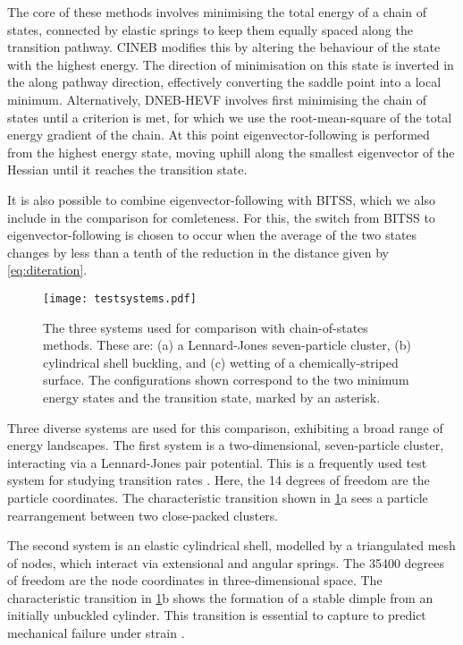 \documentclass[aip,jcp,reprint,twocolumn]{revtex4-1}
\begin{document}
The core of these methods involves minimising the total energy of a chain of states, connected by elastic springs to keep them equally spaced along the transition pathway.
CINEB modifies this by altering the behaviour of the state with the highest energy.
The direction of minimisation on this state is inverted in the along pathway direction, effectively converting the saddle point into a local minimum.
Alternatively, DNEB-HEVF involves first minimising the chain of states until a criterion is met, for which we use the root-mean-square of the total energy gradient of the chain. 
At this point eigenvector-following is performed from the highest energy state, moving uphill along the smallest eigenvector of the Hessian until it reaches the transition state.

It is also possible to combine eigenvector-following with BITSS, which we also include in the comparison for comleteness.
For this, the switch from BITSS to eigenvector-following is chosen to occur when the average of the two states changes by less than a tenth of the reduction in the distance given by \cref{eq:diteration}.

\begin{figure}[tb]
  \texttt{[image: testsystems.pdf]}
  \caption{\label{fig:testsystems}
    The three systems used for comparison with chain-of-states methods.
    These are: (a) a Lennard-Jones seven-particle cluster, (b) cylindrical shell buckling, and (c) wetting of a chemically-striped surface.
    The configurations shown correspond to the two minimum energy states and the transition state, marked by an asterisk.
  }
\end{figure}

Three diverse systems are used for this comparison, exhibiting a broad range of energy landscapes.
The first system is a two-dimensional, seven-particle cluster, interacting via a Lennard-Jones pair potential.
This is a frequently used test system for studying transition rates \cite{Wales2002,Passerone2001}.
Here, the 14 degrees of freedom are the particle coordinates.
The characteristic transition shown in \cref{fig:testsystems}a sees a particle rearrangement between two close-packed clusters.

The second system is an elastic cylindrical shell, modelled by a triangulated mesh of nodes, which interact via extensional and angular springs.
The \num{35400} degrees of freedom are the node coordinates in three-dimensional space.
The characteristic transition in \cref{fig:testsystems}b shows the formation of a stable dimple from an initially unbuckled cylinder.
This transition is essential to capture to predict mechanical failure under strain \cite{Panter2019,Virot2017}.
\end{document}
